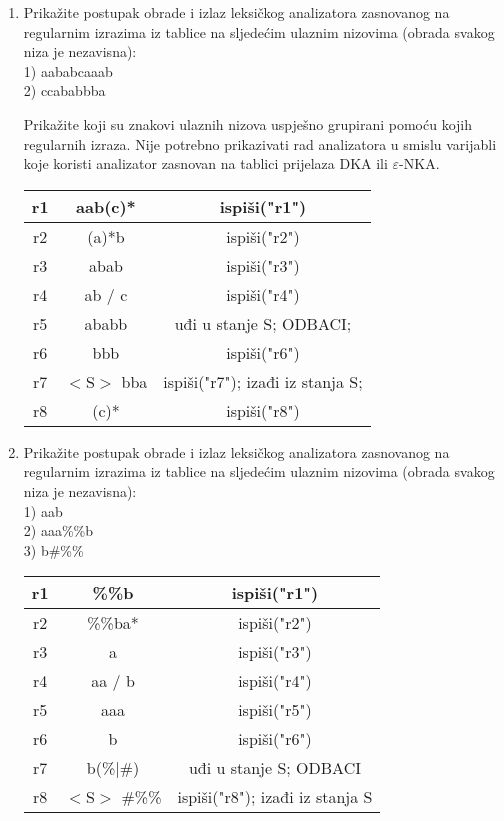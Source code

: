 \documentclass[times, 12pt, utf8]{book}
\begin{document}
\begin{enumerate}[resume]
\item
Prikažite postupak obrade i izlaz leksičkog analizatora zasnovanog na regularnim izrazima iz tablice na sljedećim ulaznim nizovima (obrada svakog niza je nezavisna):\\
1) aababcaaab\\
2) ccababbba

Prikažite koji su znakovi ulaznih nizova uspješno grupirani pomoću kojih regularnih izraza. Nije potrebno prikazivati rad analizatora u smislu varijabli koje koristi analizator zasnovan na tablici prijelaza DKA ili \(\varepsilon\)-NKA. \cite[str.~47-48]{udzbenik} \cite{auditorne}

\begin{tabular}{|c|c|c|} \hline
r1 & aab(c)* & ispiši("r1") \\ \hline
r2 & (a)*b & ispiši("r2") \\ \hline
r3 & abab & ispiši("r3") \\ \hline
r4 & ab / c & ispiši("r4") \\ \hline
r5 & ababb & uđi u stanje S; ODBACI; \\ \hline
r6 & bbb & ispiši("r6") \\ \hline
r7 & $<$S$>$ bba & ispiši("r7"); izađi iz stanja S; \\ \hline
r8 & (c)* & ispiši("r8") \\ \hline
\end{tabular} 

\item
Prikažite postupak obrade i izlaz leksičkog analizatora zasnovanog na regularnim izrazima iz tablice na sljedećim ulaznim nizovima (obrada svakog niza je nezavisna):\\
1) aab\\
2) aaa\%\%b\\
3) b\#\%\%

\begin{tabular}{|c|c|c|} \hline
r1 & \%\%b & ispiši("r1") \\ \hline
r2 & \%\%ba* & ispiši("r2") \\ \hline
r3 & a & ispiši("r3") \\ \hline
r4 & aa / b & ispiši("r4") \\ \hline
r5 & aaa & ispiši("r5") \\ \hline
r6 & b & ispiši("r6") \\ \hline
r7 & b(\%$\mid$\#) & uđi u stanje S; ODBACI \\ \hline
r8 & $<$S$>$ \#\%\% & ispiši("r8"); izađi iz stanja S \\ \hline
\end{tabular}


\end{enumerate}
\end{document}
